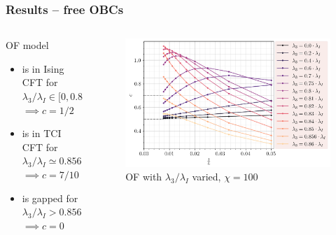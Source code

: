 \documentclass[10pt]{beamer}
\begin{document}
\begin{frame}
    \frametitle{Results -- free OBCs}

    \begin{columns}
        \begin{column}{0.35\linewidth}
            \begin{block}{OF model}
                \begin{itemize}
                    \item is in Ising CFT for $\lambda_3/\lambda_I \in [0, 0.856[$ $\implies c=1/2$
                    \pause
                    \item is in TCI CFT for $\lambda_3/\lambda_I \simeq 0.856$ $\implies c=7/10$
                    \pause
                    \item is gapped for $\lambda_3/\lambda_I > 0.856$ $\implies c=0$
                \end{itemize}
            \end{block}
        \end{column}        

        \pause
        \begin{column}{0.75\linewidth}
            \begin{figure}
                \includegraphics[scale=0.43]{../../graphs/phase/ff/chi=100.0_J=1.0_h=1.0_i=1.0_c=0.0.png}
                \caption{OF with $\lambda_3/\lambda_I$ varied, $\chi=100$}
            \end{figure}
        \end{column}
    \end{columns}
\end{frame}
\end{document}
